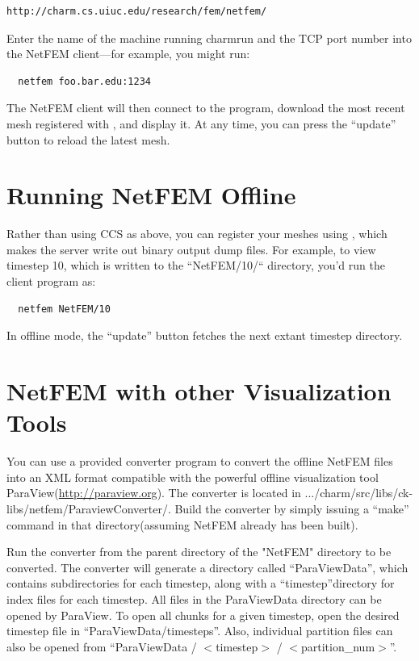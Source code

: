 \documentclass[10pt]{article}
\begin{document}
\begin{verbatim}
http://charm.cs.uiuc.edu/research/fem/netfem/
\end{verbatim}

Enter the name of the machine running charmrun and
the TCP port number into the NetFEM client---for example, 
you might run:

\begin{verbatim}
  netfem foo.bar.edu:1234
\end{verbatim}

The NetFEM client will then connect to the program,
download the most recent mesh registered with 
, and display it.
At any time, you can press the ``update'' button 
to reload the latest mesh.


\section{Running NetFEM Offline}

Rather than using CCS as above, you can register your meshes
using , which makes the server write out 
binary output dump files.  For example, to view timestep 10,
which is written to the ``NetFEM/10/`` directory, you'd 
run the client program as:

\begin{verbatim}
  netfem NetFEM/10
\end{verbatim}

In offline mode, the ``update'' button fetches the next
extant timestep directory.

\section{NetFEM with other Visualization Tools}

You can use a provided converter program to convert the offline NetFEM files into an XML format compatible with the powerful offline visualization tool ParaView(\url{http://paraview.org}). The converter is located in .../charm/src/libs/ck-libs/netfem/ParaviewConverter/. Build the converter by simply issuing a ``make'' command in that directory(assuming NetFEM already has been built).



Run the converter from the parent directory of the "NetFEM" directory to be converted. The converter will generate a directory called ``ParaViewData'', which contains subdirectories for each timestep, along with a ``timestep''directory for index files for each timestep. All files in the ParaViewData directory can be opened by ParaView. To open all chunks for a given timestep, open the desired timestep file in ``ParaViewData/timesteps''. Also, individual partition files can also be opened from ``ParaViewData / $<$timestep$>$ / $<$partition\_num$>$''.
\end{document}
